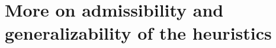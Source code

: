 \documentclass[10pt]{article}
\begin{document}
















\appendix




































\section{More on admissibility and generalizability of the heuristics}\label{more-on}
\end{document}
